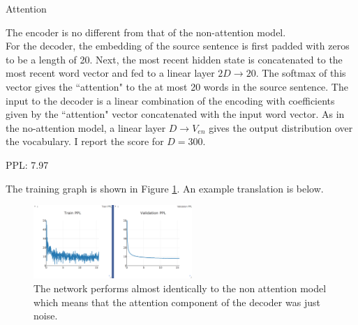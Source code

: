 \documentclass[11pt]{article}
\begin{document}
\begin{subsection}{Attention}

The encoder is no different from that of the non-attention model.\\
For the decoder, the embedding of the source sentence is first padded with zeros to be a length of 20. Next, the most recent hidden state is concatenated to the most recent word vector and fed to a linear layer $2D \rightarrow 20$. The softmax of this vector gives the ``attention" to the at most 20 words in the source sentence. The input to the decoder is a linear combination of the encoding with coefficients given by the ``attention" vector concatenated with the input word vector. As in the no-attention model, a linear layer $D \rightarrow V_{en}$ gives the output distribution over the vocabulary. I report the score for $D=300$.\\
\centerline{PPL: 7.97}
The training graph is shown in Figure \ref{fig:att}. An example translation is below.

 \begin{figure}
  \centering
  \includegraphics[width=6cm]{imgs/att}
  \caption{\label{fig:att} The network performs almost identically to the non attention model which means that the attention component of the decoder was just noise.}
\end{figure}
\end{subsection}
\end{document}
